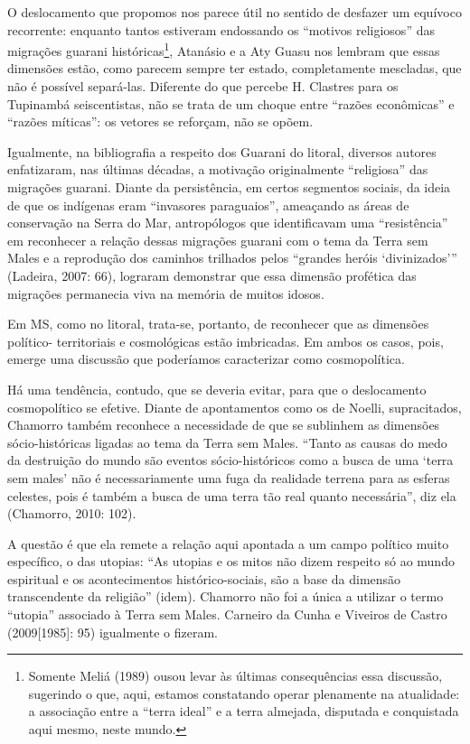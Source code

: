 O deslocamento que propomos nos parece útil no sentido de desfazer um
equívoco recorrente: enquanto tantos estiveram endossando os ``motivos
religiosos'' das migrações guarani históricas\footnote{Somente Meliá
(1989) ousou levar às últimas consequências essa discussão, sugerindo o
que, aqui, estamos constatando operar plenamente na atualidade: a
associação entre a ``terra ideal'' e a terra almejada, disputada e
conquistada aqui mesmo, neste mundo.}, Atanásio e a Aty Guasu nos
lembram que essas dimensões estão, como parecem sempre ter estado,
completamente mescladas, que não é possível separá-las. Diferente do
que percebe H. Clastres para os Tupinambá seiscentistas, não se trata
de um choque entre ``razões econômicas'' e ``razões míticas'': os vetores
se reforçam, não se opõem.

Igualmente, na bibliografia a respeito dos Guarani do litoral, diversos
autores enfatizaram, nas últimas décadas, a motivação originalmente
``religiosa'' das migrações guarani. Diante da persistência, em certos
segmentos sociais, da ideia de que os indígenas eram ``invasores
paraguaios'', ameaçando as áreas de conservação na Serra do Mar,
antropólogos que identificavam uma ``resistência'' em reconhecer a
relação dessas migrações guarani com o tema da Terra sem Males e a
reprodução dos caminhos trilhados pelos ``grandes heróis ‘divinizados’''
(Ladeira, 2007: 66), lograram demonstrar que essa dimensão profética
das migrações permanecia viva na memória de muitos idosos. 

Em MS, como no litoral, trata-se, portanto, de reconhecer que as
dimensões político- territoriais e cosmológicas estão imbricadas. Em
ambos os casos, pois, emerge uma discussão que poderíamos caracterizar
como cosmopolítica.

Há uma tendência, contudo, que se deveria evitar, para que o
deslocamento cosmopolítico se efetive. Diante de apontamentos como os
de Noelli, supracitados, Chamorro também reconhece a necessidade de que
se sublinhem as dimensões sócio-históricas ligadas ao tema da Terra sem
Males. ``Tanto as causas do medo da destruição do mundo são eventos
sócio-históricos como a busca de uma ‘terra sem males’ não é
necessariamente uma fuga da realidade terrena para as esferas celestes,
pois é também a busca de uma terra tão real quanto necessária'', diz ela
(Chamorro, 2010: 102). 

A questão é que ela remete a relação aqui apontada a um campo político
muito específico, o das utopias: ``As utopias e os mitos não dizem
respeito só ao mundo espiritual e os acontecimentos histórico-sociais,
são a base da dimensão transcendente da religião'' (idem). Chamorro não
foi a única a utilizar o termo ``utopia'' associado à Terra sem Males.
Carneiro da Cunha e Viveiros de Castro (2009[1985]: 95) igualmente o
fizeram. 

